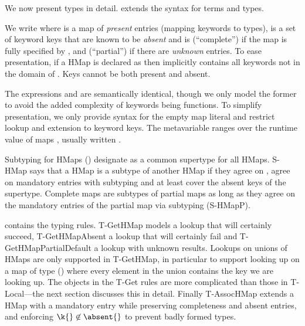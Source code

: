 {We now present \HMapliteral{} types in detail.
 extends the syntax for terms and types.

We write \HMapgeneric{\mandatory{}}{\absent{}}
where {\mandatory{}} is a map of \emph{present} entries (mapping keywords to types),
\absent{} is a set of keyword keys that are known to be \emph{absent}
and
\completenessmeta{} is {\complete{}} (``complete'') if the map is fully specified by \mandatory{},
and {\partial{}} (``partial'') if there are \emph{unknown} entries.
To ease presentation, 
if a HMap is declared as \complete{} then \absent{} implicitly contains all keywords not in the domain of \mandatory{}.
Keys cannot be both present and absent.

The expressions  and  are semantically identical, though
we only model the former to avoid the added complexity of keywords being functions.
To simplify presentation, we only provide syntax for the empty map literal and
restrict lookup and extension to keyword keys. The metavariable \mapval{}
ranges over the runtime value of maps {\curlymapvaloverright{\k{}}{\v{}}},
usually written {\curlymapvaloverrightnoarrow{\k{}}{\v{}}}.

Subtyping for HMaps ()
designate \MapLiteral{} as a common supertype for all HMaps.
S-HMap says that a HMap is a subtype of another HMap if they agree
on \completenessmeta{}, agree on mandatory entries with subtyping
and at least cover the absent keys of the supertype.
Complete maps are subtypes of partial maps
as long as they agree on the mandatory entries of the partial map via subtyping (S-HMapP).

 contains the typing rules. T-GetHMap models a lookup
that will certainly succeed, T-GetHMapAbsent a lookup that will certainly fail
and T-GetHMapPartialDefault a lookup with unknown results.
Lookups on unions of HMaps are only supported in T-GetHMap, 
in particular to support
looking up  on a map of type  ()
where every element in the union
contains the key we are looking up.
The objects in the T-Get rules are more complicated than those in T-Local---the 
next section discusses this in detail.
Finally T-AssocHMap extends a HMap with a mandatory entry while preserving completeness
and absent entries, and enforcing ${\k{}} \not\in {\absent{}}$ to prevent badly
formed types.

}
